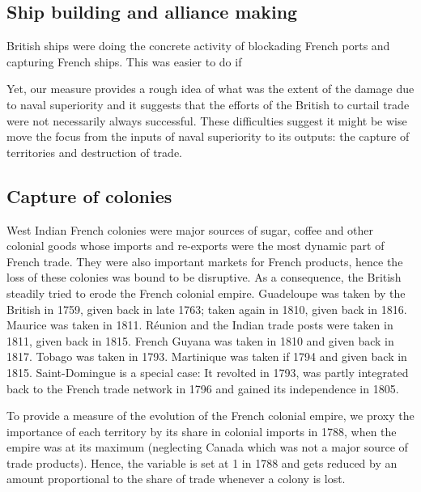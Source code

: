 \documentclass[12pt,a4paper,notitlepage,english]{article}
\begin{document}
\subsection{Ship building and alliance making}
British ships were doing the concrete activity of blockading French ports and capturing French ships.
This was easier to do if 

Yet, our measure provides a rough idea of what was the extent of the damage due to naval superiority and it suggests that the efforts of the British to curtail trade were not necessarily always successful. 
These difficulties suggest it might be wise move the focus from the inputs of naval superiority to its outputs: the capture of territories and destruction of trade.

\subsection{Capture of colonies}
West Indian French colonies were major sources of sugar, coffee and other colonial goods whose imports and re-exports were the most dynamic part of French trade.
They were also important markets for French products, hence the loss of these colonies was bound to be disruptive. 
As a consequence, the British steadily tried to erode the French colonial empire.
Guadeloupe was taken by the British in 1759, given back in late 1763; taken again in 1810, given back in 1816.
Maurice was taken in 1811.
Réunion and the Indian trade posts were taken in 1811, given back in 1815.
French Guyana was taken in 1810 and given back in 1817.
Tobago was taken in 1793.
Martinique was taken if 1794 and given back in 1815.
Saint-Domingue is a special case: It revolted in 1793, was partly integrated back to the French trade network in 1796 and gained its independence in 1805. 

To provide a measure of the evolution of the French colonial empire, we proxy the importance of each territory by its share in colonial imports in 1788, when the empire was at its maximum (neglecting Canada which was not a major source of trade products).
Hence, the variable is set at 1 in 1788 and gets reduced by an amount proportional to the share of trade whenever a colony is lost. 
\end{document}
